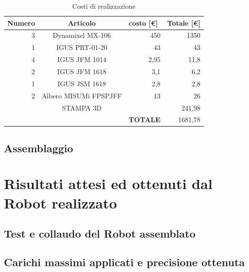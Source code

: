 \documentclass[%
corpo=11pt,
twoside,
 stile=classica,
oldstyle,
greek,%
]{toptesi}
\begin{document}
	\begin{table}[htbp]
		\centering
		\caption{Costi di realizzazione}
		\begin{tabular}{rrr|r|r|}
			\hline
			\multicolumn{1}{|l|}{\textbf{Numero}} & \multicolumn{2}{c|}{\textbf{Articolo}} & \multicolumn{1}{l|}{\textbf{costo [€]}} & \multicolumn{1}{l|}{\textbf{Totale [€]}} \bigstrut\\
			\hline
			\multicolumn{1}{|r|}{3} & \multicolumn{2}{c|}{Dynamixel MX-106} & 450   & 1350 \bigstrut\\
			\hline
			\multicolumn{1}{|r|}{1} & \multicolumn{2}{c|}{IGUS PRT-01-20} & 43    & 43 \bigstrut\\
			\hline
			\multicolumn{1}{|r|}{4} & \multicolumn{2}{c|}{IGUS JFM 1014} & 2,95  & 11,8 \bigstrut\\
			\hline
			\multicolumn{1}{|r|}{2} & \multicolumn{2}{c|}{IGUS JFM 1618} & 3,1   & 6,2 \bigstrut\\
			\hline
			\multicolumn{1}{|r|}{1} & \multicolumn{2}{c|}{IGUS JSM 1618} & 2,8   & 2,8 \bigstrut\\
			\hline
			\multicolumn{1}{|r|}{2} & \multicolumn{2}{c|}{Albero MISUMi FPSPJFF} & 13    & 26 \bigstrut\\
			\hline
			\multicolumn{1}{|r|}{} & \multicolumn{2}{c|}{STAMPA 3D} &       & 241,98 \bigstrut\\
			\hline
			&       &       & \textbf{TOTALE} & 1681,78 \bigstrut\\
			\cline{4-5}    \end{tabular}%
		\label{tab:projectcost}%
	\end{table}%
	
	\section{Assemblaggio}
	
\chapter{Risultati attesi ed ottenuti dal Robot realizzato}
	\section{Test e collaudo del Robot assemblato}
	\section{Carichi massimi applicati e precisione ottenuta}
\end{document}
